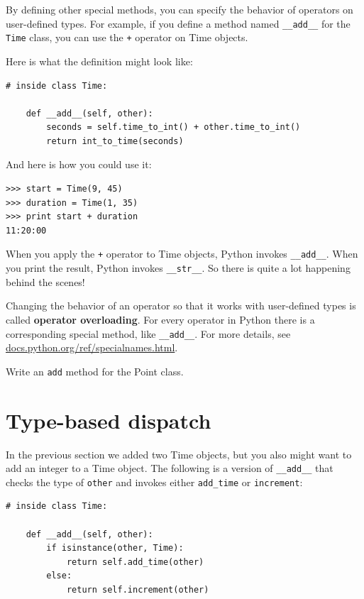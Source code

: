 \documentclass[10pt]{book}
\begin{document}
{By defining other special methods, you can specify the behavior
of operators on user-defined types.  For example, if you define
a method named \verb"__add__" for the {\tt Time} class, you can use the
{\tt +} operator on Time objects.

Here is what the definition might look like:


\beforeverb
\begin{verbatim}
# inside class Time:

    def __add__(self, other):
        seconds = self.time_to_int() + other.time_to_int()
        return int_to_time(seconds)
\end{verbatim}
\afterverb
%
And here is how you could use it:

\beforeverb
\begin{verbatim}
>>> start = Time(9, 45)
>>> duration = Time(1, 35)
>>> print start + duration
11:20:00
\end{verbatim}
\afterverb
%
When you apply the {\tt +} operator to Time objects, Python invokes
\verb"__add__".  When you print the result, Python invokes 
\verb"__str__".  So there is quite a lot happening behind the scenes!


Changing the behavior of an operator so that it works with
user-defined types is called {\bf operator overloading}.  For every
operator in Python there is a corresponding special method, like 
\verb"__add__".  For more details, see
\url{docs.python.org/ref/specialnames.html}.

\begin{ex}
Write an {\tt add} method for the Point class.  
\end{ex}


\section{Type-based dispatch}

In the previous section we added two Time objects, but you
also might want to add an integer to a Time object.  The
following is a version of \verb"__add__"
that checks the type of {\tt other} and invokes either
\verb"add_time" or {\tt increment}:

\beforeverb
\begin{verbatim}
# inside class Time:

    def __add__(self, other):
        if isinstance(other, Time):
            return self.add_time(other)
        else:
            return self.increment(other)


\end{verbatim}}
\end{document}
